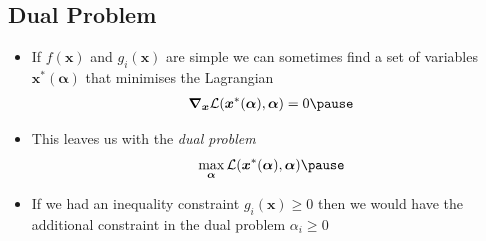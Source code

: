 
\begin{slide}
\section{Dual Problem}

\begin{PauseHighLight}
  \begin{itemize}
  \item If $f(\bm{x})$ and $g_i(\bm{x})$ are simple we can sometimes
    find a set of variables $\bm{x}^*(\bm{\alpha})$ that minimises the
    Lagrangian
    \begin{align*}
      \grad_{\bm{x}} \mathcal{L}(\bm{x}^*(\bm{\alpha}),\bm{\alpha}) = 0\pause
    \end{align*}
  \item This leaves us with the \emph{dual problem}
    \begin{align*}
      \max_{\bm{\alpha}} \mathcal{L}(\bm{x}^*(\bm{\alpha}),\bm{\alpha})\pause
    \end{align*}
  \item If we had an inequality constraint $g_i(\bm{x})\geq 0$ then we
    would have the additional constraint in the dual problem
    $\alpha_i\geq0$\pause
  \end{itemize}
\end{PauseHighLight}

\end{slide}


